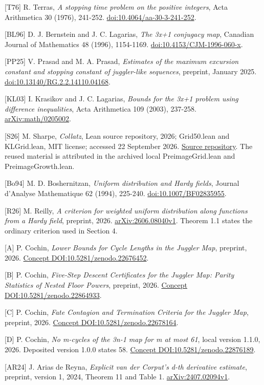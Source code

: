 \documentclass[11pt,a4paper]{article}
\begin{document}
\begingroup\small

{[}T76{]} R. Terras, \emph{A stopping time problem on the positive
integers}, Acta Arithmetica 30 (1976), 241-252.
\href{https://doi.org/10.4064/aa-30-3-241-252}{doi:10.4064/aa-30-3-241-252}.

{[}BL96{]} D. J. Bernstein and J. C. Lagarias, \emph{The 3x+1 conjugacy
map}, Canadian Journal of Mathematics 48 (1996), 1154-1169.
\href{https://doi.org/10.4153/CJM-1996-060-x}{doi:10.4153/CJM-1996-060-x}.

{[}PP25{]} V. Prasad and M. A. Prasad, \emph{Estimates of the maximum
excursion constant and stopping constant of juggler-like sequences},
preprint, January 2025.
\href{https://doi.org/10.13140/RG.2.2.14110.04168}{doi:10.13140/RG.2.2.14110.04168}.

{[}KL03{]} I. Krasikov and J. C. Lagarias, \emph{Bounds for the 3x+1
problem using difference inequalities}, Acta Arithmetica 109 (2003),
237-258. \href{https://arxiv.org/abs/math/0205002}{arXiv:math/0205002}.

{[}S26{]} M. Sharpe, \emph{Collatz}, Lean source repository, 2026;
Grid50.lean and KLGrid.lean, MIT license; accessed 22 September 2026.
\href{https://github.com/msharpe248/collatz}{Source repository}. The
reused material is attributed in the archived local PreimageGrid.lean
and PreimageGrowth.lean.

{[}Bo94{]} M. D. Boshernitzan, \emph{Uniform distribution and Hardy
fields}, Journal d'Analyse Mathematique 62 (1994), 225-240.
\href{https://doi.org/10.1007/BF02835955}{doi:10.1007/BF02835955}.

{[}R26{]} M. Reilly, \emph{A criterion for weighted uniform distribution
along functions from a Hardy field}, preprint, 2026.
\href{https://arxiv.org/abs/2606.08040v1}{arXiv:2606.08040v1}. Theorem
1.1 states the ordinary criterion used in Section 4.

{[}A{]} P. Cochin, \emph{Lower Bounds for Cycle Lengths in the Juggler
Map}, preprint, 2026.
\href{https://doi.org/10.5281/zenodo.22676452}{Concept
DOI:10.5281/zenodo.22676452}.

{[}B{]} P. Cochin, \emph{Five-Step Descent Certificates for the Juggler
Map: Parity Statistics of Nested Floor Powers}, preprint, 2026.
\href{https://doi.org/10.5281/zenodo.22864933}{Concept
DOI:10.5281/zenodo.22864933}.

{[}C{]} P. Cochin, \emph{Fate Contagion and Termination Criteria for the
Juggler Map}, preprint, 2026.
\href{https://doi.org/10.5281/zenodo.22678164}{Concept
DOI:10.5281/zenodo.22678164}.

{[}D{]} P. Cochin, \emph{No m-cycles of the 3n-1 map for m at most 61},
local version 1.1.0, 2026. Deposited version 1.0.0 states 58.
\href{https://doi.org/10.5281/zenodo.22876189}{Concept
DOI:10.5281/zenodo.22876189}.

{[}AR24{]} J. Arias de Reyna, \emph{Explicit van der Corput's d-th
derivative estimate}, preprint, version 1, 2024, Theorem 11 and Table 1.
\href{https://arxiv.org/abs/2407.02094v1}{arXiv:2407.02094v1}.

\endgroup
\end{document}
